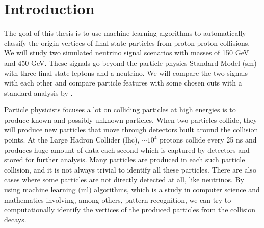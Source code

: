 \documentclass[a4paper, american, 12pt]{report}
\begin{document}
	\listoftables{}
	
	\lstlistoflistings{}
	
	

	\chapter{Introduction}
	\label{chap:Intro}
	The goal of this thesis is to use machine learning algorithms to automatically classify the origin vertices of final state particles from proton-proton collisions. We will study two simulated neutrino signal scenarios with masses of 150 GeV and 450 GeV. These signals go beyond the particle physics Standard Model (\acrshort{sm}) with three final state leptons and a neutrino. We will compare the two signals with each other and compare particle features with some chosen cuts with a standard analysis by \citet{inverseseesaw}.
	
	Particle physicists focuses a lot on colliding particles at high energies is to produce known and possibly unknown particles. When two particles collide, they will produce new particles that move through detectors built around the collision points. At the Large Hadron Collider (\acrfull{lhc}), $\sim 10^4$ protons collide every 25 ns and produces huge amount of data each second which is captured by detectors and stored for further analysis. Many particles are produced in each such particle collision, and it is not always trivial to identify all these particles. There are also cases where some particles are not directly detected at all, like neutrinos. By using machine learning (\acrshort{ml}) algorithms, which is a study in computer science and mathematics involving, among others, pattern recognition, we can try to computationally identify the vertices of the produced particles from the collision decays. 
	
\end{document}
